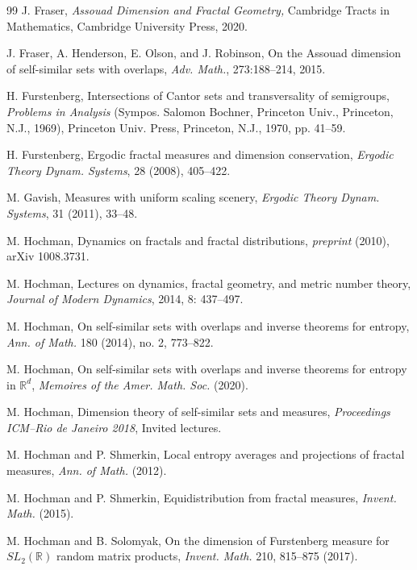 \documentclass[a4paper,11pt]{amsart}
\theoremstyle{definition}
\numberwithin{equation}{section}
\def\R{\mathbb R}
\begin{document}
\begin{thebibliography}{99}
J.  Fraser,  {\em Assouad Dimension and Fractal Geometry, }  Cambridge Tracts in
Mathematics,  Cambridge University Press,  2020.

J.  Fraser, A.  Henderson, E.  Olson, and J.  Robinson,  On the Assouad dimension
of self-similar sets with overlaps,  {\em Adv. Math.}, 273:188--214, 2015.

 H. Furstenberg, Intersections of Cantor sets and transversality of semigroups,
\emph{Problems in Analysis} (Sympos. Salomon Bochner, Princeton Univ., Princeton, N.J., 1969), Princeton Univ. Press, Princeton,
N.J., 1970, pp. 41–59.


H. Furstenberg,  Ergodic fractal measures and dimension conservation, {\em Ergodic Theory Dynam. Systems}, 28 (2008), 405--422.

 M. Gavish,  Measures with uniform scaling scenery,  {\em Ergodic Theory Dynam. Systems}, 31 (2011), 33--48.


  M.  Hochman,  Dynamics on fractals and fractal distributions,  \emph{preprint} (2010), arXiv 1008.3731.

 M.  Hochman,  Lectures on dynamics, fractal geometry, and metric number theory,  \emph{Journal of Modern Dynamics}, 2014, 8: 437--497.

 M. Hochman, On self-similar sets with overlaps and inverse theorems for entropy,    \emph{Ann. of Math.} 180 (2014), no. 2, 773--822.

 M. Hochman, On self-similar sets with overlaps and inverse theorems for entropy in $\mathbb{R}^d$,    \emph{Memoires of the Amer. Math. Soc.} (2020).

 M. Hochman,  Dimension theory of self-similar sets and measures,  {\em Proceedings ICM--Rio de Janeiro 2018},  Invited lectures.

 M. Hochman and P. Shmerkin, Local entropy averages and projections of fractal measures,    \emph{Ann. of Math.} (2012).

 M. Hochman and P. Shmerkin, Equidistribution from fractal measures,    \emph{Invent. Math.}  (2015).

 M. Hochman and B.  Solomyak,   On the dimension of Furstenberg measure for $SL_2(\R)$ random matrix products,  {\em Invent.  Math. }  210,  815--875 (2017).


\end{thebibliography}
\end{document}
